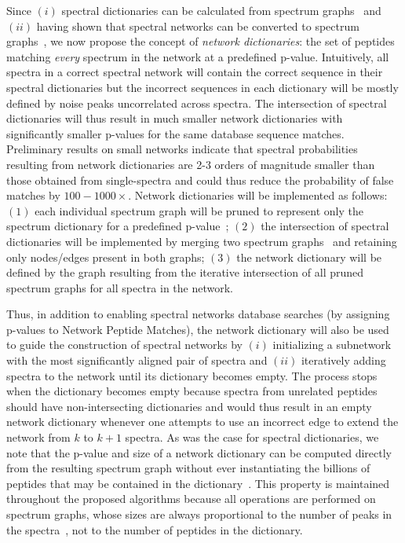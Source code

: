 \documentclass[arial,11pt]{article}
\begin{document}
Since $(i)$ spectral dictionaries can be calculated from spectrum graphs~\cite{kim09msdict} and $(ii)$ having shown that spectral networks can be converted to spectrum graphs~\cite{bandeira07mcp,guthals12metasps}, we now propose the concept of {\em network dictionaries}: the set of peptides matching {\em every} spectrum in the network at a predefined p-value.
%
Intuitively, all spectra in a correct spectral network will contain the correct sequence in their spectral dictionaries but the incorrect sequences in each dictionary will be mostly defined by noise peaks uncorrelated across spectra. The intersection of spectral dictionaries will thus result in much smaller network dictionaries with significantly smaller p-values for the same database sequence matches. Preliminary results on small networks indicate that spectral probabilities resulting from network dictionaries are 2-3 orders of magnitude smaller than those obtained from single-spectra and could thus reduce the probability of false matches by $100-1000\times$.
%
%
Network dictionaries will be implemented as follows: $(1)$ each individual spectrum graph will be pruned to represent only the spectrum dictionary for a predefined p-value~\cite{jeong11}; $(2)$ the intersection of spectral dictionaries will be implemented by merging two spectrum graphs~\cite{bandeira07mcp,guthals12metasps} and retaining only nodes/edges present in both graphs; $(3)$ the network dictionary will be defined by the graph resulting from the iterative intersection of all pruned spectrum graphs for all spectra in the network.

Thus, in addition to enabling spectral networks database searches (by assigning p-values to Network Peptide Matches), the network dictionary will also be used to guide the construction of spectral networks by $(i)$ initializing a subnetwork with the most significantly aligned pair of spectra and $(ii)$ iteratively adding spectra to the network until its dictionary becomes empty. The process stops when the dictionary becomes empty because spectra from unrelated peptides should have non-intersecting dictionaries and would thus result in an empty network dictionary whenever one attempts to use an incorrect edge to extend the network from $k$ to $k+1$ spectra. As was the case for spectral dictionaries, we note that the p-value and size of a network dictionary can be computed directly from the resulting spectrum graph without ever instantiating the billions of peptides that may be contained in the dictionary~\cite{kim08}. This property is maintained throughout the proposed algorithms because all operations are performed on spectrum graphs, whose sizes are always proportional to the number of peaks in the spectra~\cite{bartels90}, not to the number of peptides in the dictionary.
\end{document}
